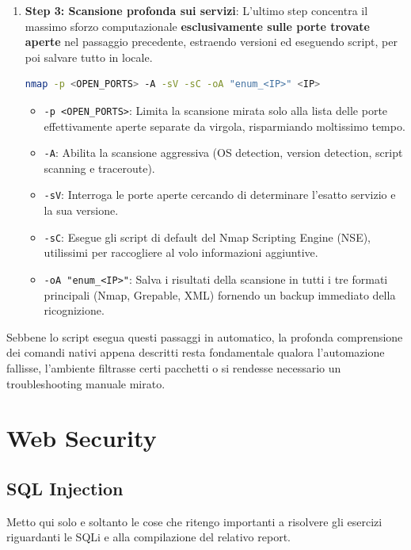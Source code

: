 \documentclass[12pt,a4paper]{report}
\begin{document}
\begin{enumerate}
		\item \textbf{Step 3: Scansione profonda sui servizi}: L'ultimo step concentra il massimo sforzo computazionale \textbf{esclusivamente sulle porte trovate aperte} nel passaggio precedente, estraendo versioni ed eseguendo script, per poi salvare tutto in locale.
		\begin{lstlisting}[language=bash]
			nmap -p <OPEN_PORTS> -A -sV -sC -oA "enum_<IP>" <IP>
		\end{lstlisting}
		\begin{itemize}
			\item \texttt{-p <OPEN\_PORTS>}: Limita la scansione mirata solo alla lista delle porte effettivamente aperte separate da virgola, risparmiando moltissimo tempo.
			\item \texttt{-A}: Abilita la scansione aggressiva (OS detection, version detection, script scanning e traceroute).
			\item \texttt{-sV}: Interroga le porte aperte cercando di determinare l'esatto servizio e la sua versione.
			\item \texttt{-sC}: Esegue gli script di default del Nmap Scripting Engine (NSE), utilissimi per raccogliere al volo informazioni aggiuntive.
			\item \texttt{-oA "enum\_<IP>"}: Salva i risultati della scansione in tutti i tre formati principali (Nmap, Grepable, XML) fornendo un backup immediato della ricognizione.
		\end{itemize}
	\end{enumerate}
	
	\begin{nota}
		Sebbene lo script esegua questi passaggi in automatico, la profonda comprensione dei comandi nativi appena descritti resta fondamentale qualora l'automazione fallisse, l'ambiente filtrasse certi pacchetti o si rendesse necessario un troubleshooting manuale mirato.
	\end{nota}
	
	\chapter{Web Security}
	
	\section{SQL Injection}
	
	Metto qui solo e soltanto le cose che ritengo importanti a risolvere gli esercizi riguardanti le SQLi e alla compilazione del relativo report.
	
\end{document}
